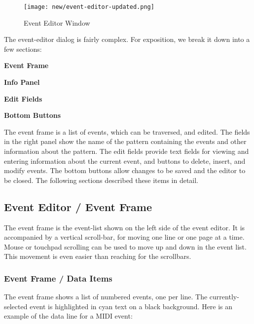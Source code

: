 \begin{figure}[H]
   \centering 
   \texttt{[image: new/event-editor-updated.png]}
   \caption{Event Editor Window}
   \label{fig:event_editor_window}
\end{figure}

   The event-editor dialog is fairly complex.
   For exposition, we break it down into a few sections:

   \begin{enumber}
      \item \textbf{Event Frame}
      \item \textbf{Info Panel}
      \item \textbf{Edit Fields}
      \item \textbf{Bottom Buttons}
   \end{enumber}

   The event frame is a list of events, which can be traversed, and edited.
   The fields in the right panel show the name of
   the pattern containing the events and other information about the
   pattern.  The edit fields provide text fields for viewing and entering
   information about the current event, and buttons to delete, insert, and
   modify events.  The bottom buttons allow changes to be saved and the editor
   to be closed.  
   The following sections described these items in detail.

\subsection{Event Editor / Event Frame}
\label{subsec:seq64_event_editor_frame}

   The event frame is the event-list shown on the left side of the
   event editor.  It is accompanied by a vertical scroll-bar, for moving one
   line or one page at a time.
   Mouse or touchpad scrolling can be used to move up and down
   in the event list.  This movement is even easier than reaching for the
   scrollbars.

\subsubsection{Event Frame / Data Items}
\label{subsec:seq64_event_frame_data}

   The event frame shows a list of numbered events, one per line.
   The currently-selected event is highlighted in cyan text on a black
   background.  Here is an example of the data line for a MIDI event:

